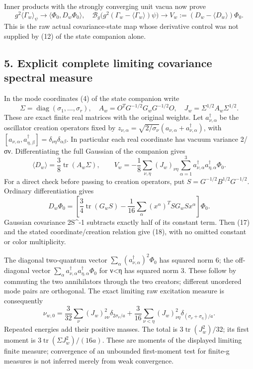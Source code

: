 \documentclass[
  11pt,
]{article}
\begin{document}
Inner products with the strongly converging unit vacua now prove \[
 g^2\langle\Gamma_w\rangle_\psi\to
          \langle\Phi_0,D_w\Phi_0\rangle,
\quad
 \mathcal B_g\bigl(g^2(\Gamma_w-\langle\Gamma_w\rangle)\psi\bigr)
     \to V_w:=(D_w-\langle D_w\rangle)\Phi_0.              \tag{16}
\] This is the raw actual covariance-state map whose derivative control
was not supplied by (12) of the state companion alone.

\subsection{5. Explicit complete limiting covariance spectral
measure}\label{weak-coupling-part-3-explicit-complete-limiting-covariance-spectral-measure}

In the mode coordinates (4) of the state companion write \[
 \Sigma=\operatorname{diag}(\sigma_1,\ldots,\sigma_r),
 \quad A_w=O^TG^{-1/2}G_wG^{-1/2}O,
 \quad J_w=\Sigma^{1/2}A_w\Sigma^{1/2}.                    \tag{17}
\] These are exact finite real matrices with the original weights. Let
\(a_{\nu,\alpha}^{\dagger}\) be the oscillator creation operators fixed
by \(z_{\nu,\alpha}=\sqrt{2/\sigma_\nu}
(a_{\nu,\alpha}+a_{\nu,\alpha}^{\dagger})\), with
\([a_{\nu,\alpha},a_{\eta,\beta}^{\dagger}]
=\delta_{\nu\eta}\delta_{\alpha\beta}\). In particular each real
coordinate has vacuum variance 2/σν. Differentiating the full Gaussian
of the companion gives \[
 \langle D_w\rangle=\frac38\operatorname{tr}(A_w\Sigma),
 \qquad
 V_w=-\frac18\sum_{\nu,\eta}(J_w)_{\nu\eta}
                \sum_{\alpha=1}^3
                   a_{\nu,\alpha}^{\dagger}a_{\eta,\alpha}^{\dagger}\Phi_0.
                                                               \tag{18}
\] For a direct check before passing to creation operators, put
\(S=G^{-1/2}B^{1/2}G^{-1/2}\). Ordinary differentiation gives \[
 D_w\Phi_0=
 \left[\frac34\operatorname{tr}(G_wS)
  -\frac1{16}\sum_\alpha(x^\alpha)^TSG_wSx^\alpha\right]\Phi_0.
                                                               \tag{19}
\] Gaussian covariance 2S\^{}-1 subtracts exactly half of its constant
term. Then (17) and the stated coordinate/creation relation give (18),
with no omitted constant or color multiplicity.

The diagonal two-quantum vector
\(\sum_\alpha(a_{\nu,\alpha}^{\dagger})^2\Phi_0\) has squared norm 6;
the off-diagonal vector
\(\sum_\alpha a_{\nu,\alpha}^{\dagger}a_{\eta,\alpha}^{\dagger}\Phi_0\)
for ν\textless η has squared norm 3. These follow by commuting the two
annihilators through the two creators; different unordered mode pairs
are orthogonal. The exact limiting raw excitation measure is
consequently \[
 \boxed{\nu_{w,0}=
 \frac3{32}\sum_\nu (J_w)_{\nu\nu}^2\delta_{2\sigma_\nu/a}
 +\frac3{16}\sum_{\nu<\eta}(J_w)_{\nu\eta}^2
                          \delta_{(\sigma_\nu+\sigma_\eta)/a}.}
                                                               \tag{20}
\] Repeated energies add their positive masses. The total is
\(3\operatorname{tr}(J_w^2)/32\); its first moment is
\(3\operatorname{tr}(\Sigma J_w^2)/(16a)\). These are moments of the
displayed limiting finite measure; convergence of an unbounded
first-moment test for finite-g measures is not inferred merely from weak
convergence.
\end{document}
